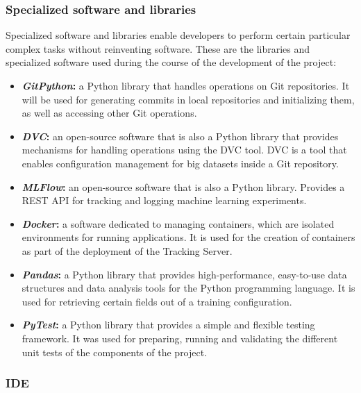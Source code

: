 \subsubsection{Specialized software and libraries}

Specialized software and libraries enable developers to perform certain particular complex tasks without reinventing software. These are the libraries and specialized software
used during the course of the development of the project:

\begin{itemize}
    \item \textbf{\emph{GitPython}: }a Python library that handles operations on Git repositories. It will be used for generating commits in local repositories and initializing them,
    as well as accessing other Git operations.

    \item \textbf{\emph{DVC}: }an open-source software that is also a Python library that provides mechanisms for handling operations using the DVC tool. DVC is a tool that enables configuration management 
    for big datasets inside a Git repository.

    \item \textbf{\emph{MLFlow}: }an open-source software that is also a Python library. Provides a REST API for tracking and logging machine learning experiments.

    \item \textbf{\emph{Docker}: }a software dedicated to managing containers, which are isolated environments for running applications. It is used for the creation of containers as part
    of the deployment of the Tracking Server.

    \item \textbf{\emph{Pandas}: }a Python library that provides high-performance, easy-to-use data structures and data analysis tools for the Python programming language. It is used for retrieving certain fields
    out of a training configuration.

    \item \textbf{\emph{PyTest}: }a Python library that provides a simple and flexible testing framework. It was used for preparing, running and validating the different unit tests of the components of the project.
\end{itemize}

\subsubsection{\acrfull{IDE}}

